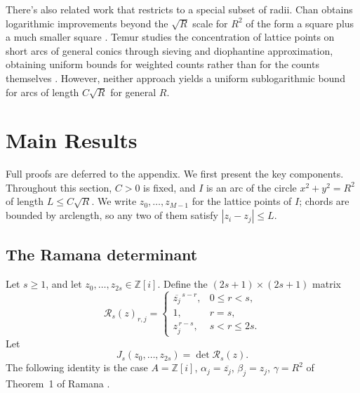 \documentclass[11pt]{article}
\newcommand{\T}{\mathbb T}
\newcommand{\GI}{\mathbb Z[i]}
\newcommand{\conj}[1]{\overline{#1}}
\newcommand{\E}{\mathcal E}
\begin{document}
There's also related work that restricts to a special subset of radii. Chan obtains logarithmic improvements beyond the \(\sqrt R\) scale for \(R^2\) of the form a square plus a much smaller square \cite{Chan2015}.
Temur studies the concentration of lattice points on short arcs of general conics through sieving and diophantine approximation, obtaining uniform bounds for weighted counts rather than for the counts themselves \cite{Temur2020}.
However, neither approach yields a uniform sublogarithmic bound for arcs of length \(C\sqrt R\) for general \(R\).



\section{Main Results}
\label{sec:mainresult}

Full proofs are deferred to the appendix.
We first present the key components.
Throughout this section, \(C>0\) is fixed, and \(I\) is an arc of the circle \(x^2+y^2=R^2\) of length \(L\le C\sqrt R\).
We write \(z_0,\dots,z_{M-1}\) for the lattice points of \(I\); chords are bounded by arclength, so any two of them satisfy \(|z_i-z_j|\le L\).

\subsection{The Ramana determinant}
\label{subsec:ramana}

Let \(s\ge 1\), and let \(z_0,\dots,z_{2s}\in\GI\).
Define the \((2s+1)\times(2s+1)\) matrix
\[
  \mathcal R_s(z)_{r,j} =
  \begin{cases}
    \conj{z_j}^{\,s-r}, & 0\le r<s,\\
    1, & r=s,\\
    z_j^{\,r-s}, & s<r\le 2s.
  \end{cases}
\]
Let
\[
  J_s(z_0,\ldots,z_{2s})=\det \mathcal R_s(z).
\]
The following identity is the case \(A=\GI\), \(\alpha_j=\conj{z_j}\), \(\beta_j=z_j\), \(\gamma=R^2\) of Theorem~1 of Ramana \cite{Ramana2007}.
\end{document}

